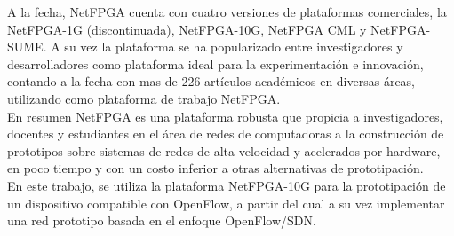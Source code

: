 A la fecha, NetFPGA cuenta con cuatro versiones de plataformas comerciales, la NetFPGA-1G  
 (discontinuada), NetFPGA-10G, NetFPGA CML y NetFPGA-SUME. A su vez la plataforma se ha popularizado entre investigadores y desarrolladores como plataforma ideal para la experimentación e innovación, contando a la fecha con mas de 226 artículos académicos\cite{NetFPGA4} en diversas áreas, utilizando como plataforma de trabajo NetFPGA.\\

En resumen NetFPGA es una plataforma robusta que propicia a investigadores, docentes y estudiantes en el área de redes de computadoras a la construcción de prototipos sobre sistemas de redes de alta velocidad y acelerados por hardware, en poco tiempo y con un costo inferior a otras alternativas de prototipaci\'on.\\

En este trabajo, se utiliza la plataforma NetFPGA-10G para la prototipaci\'on de un dispositivo compatible con OpenFlow, a partir del cual a su vez implementar una red prototipo basada en el enfoque OpenFlow/SDN. 

